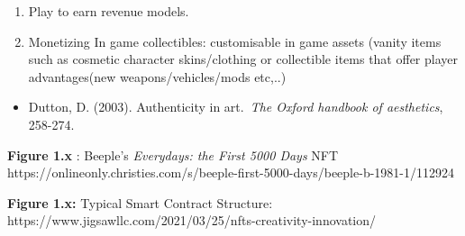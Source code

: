 \begin{enumerate}
\def\labelenumi{\alph{enumi}.}
\setcounter{enumi}{2}
\item
  Play to earn revenue models.
\item
  Monetizing In game collectibles: customisable in game assets (vanity
  items such as cosmetic character skins/clothing or collectible items
  that offer player advantages(new weapons/vehicles/mods etc,..)
\end{enumerate}

\begin{itemize}
\item
  Dutton, D. (2003). Authenticity in art.~\emph{The Oxford handbook of
  aesthetics}, 258-274.
\end{itemize}

\textbf{Figure 1.x} : Beeple's \emph{Everydays: the First 5000 Days} NFT
https://onlineonly.christies.com/s/beeple-first-5000-days/beeple-b-1981-1/112924

\textbf{Figure 1.x:} Typical Smart Contract Structure:
https://www.jigsawllc.com/2021/03/25/nfts-creativity-innovation/
